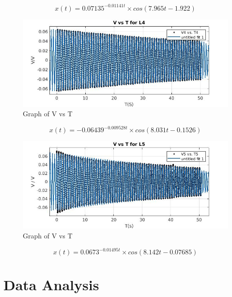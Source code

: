 $$ x(t) = 0.07135^{-0.01141t} \times cos(7.965t - 1.922)$$
\newpage\begin{figure}[h!]
    \centering
    \includegraphics[width=\textwidth]{figures/L4.jpg}
    \caption{Graph of V vs T}
    \label{fig:yx}
\end{figure}
$$ x(t) = -0.06439^{-0.009528t} \times cos(8.031t - 0.1526)$$
\newpage
\begin{figure}[h!]
    \centering
    \includegraphics[width=\textwidth]{figures/L5.jpg}
    \caption{Graph of V vs T}
    \label{fig:yx}
\end{figure}
$$ x(t) = 0.0673^{-0.01495t} \times cos(8.142t - 0.07685)$$
\section{Data Analysis}

